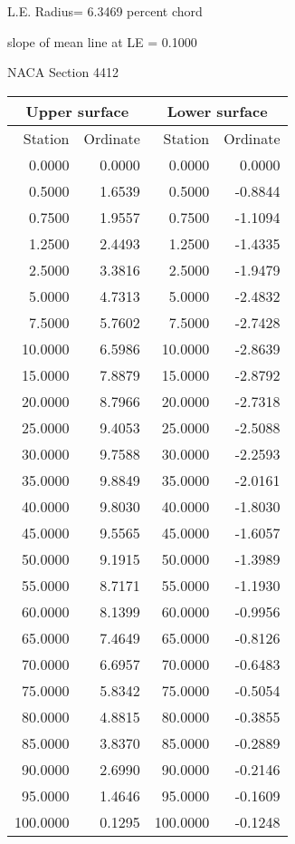 \documentclass[11pt]{book}
\begin{document}
L.E. Radius=  6.3469 percent chord


 slope of mean line at LE =  0.1000
 \newpage
  \label{s4412}
 \begin{Large}
 NACA Section 4412
 \end{Large}
  
 \vspace{8mm}
 \begin{tabular}{|r|r|r|r|} \hline 
 \multicolumn{2}{|c|}{Upper surface} & \multicolumn{2}{|c|}{Lower surface} \\
 \hline
 Station & Ordinate & Station & Ordinate \\
 \hline
0.0000 & 0.0000 & 0.0000 & 0.0000 \\
0.5000 & 1.6539 & 0.5000 & -0.8844 \\
0.7500 & 1.9557 & 0.7500 & -1.1094 \\
1.2500 & 2.4493 & 1.2500 & -1.4335 \\
2.5000 & 3.3816 & 2.5000 & -1.9479 \\
5.0000 & 4.7313 & 5.0000 & -2.4832 \\
7.5000 & 5.7602 & 7.5000 & -2.7428 \\
10.0000 & 6.5986 & 10.0000 & -2.8639 \\
15.0000 & 7.8879 & 15.0000 & -2.8792 \\
20.0000 & 8.7966 & 20.0000 & -2.7318 \\
25.0000 & 9.4053 & 25.0000 & -2.5088 \\
30.0000 & 9.7588 & 30.0000 & -2.2593 \\
35.0000 & 9.8849 & 35.0000 & -2.0161 \\
40.0000 & 9.8030 & 40.0000 & -1.8030 \\
45.0000 & 9.5565 & 45.0000 & -1.6057 \\
50.0000 & 9.1915 & 50.0000 & -1.3989 \\
55.0000 & 8.7171 & 55.0000 & -1.1930 \\
60.0000 & 8.1399 & 60.0000 & -0.9956 \\
65.0000 & 7.4649 & 65.0000 & -0.8126 \\
70.0000 & 6.6957 & 70.0000 & -0.6483 \\
75.0000 & 5.8342 & 75.0000 & -0.5054 \\
80.0000 & 4.8815 & 80.0000 & -0.3855 \\
85.0000 & 3.8370 & 85.0000 & -0.2889 \\
90.0000 & 2.6990 & 90.0000 & -0.2146 \\
95.0000 & 1.4646 & 95.0000 & -0.1609 \\
100.0000 & 0.1295 & 100.0000 & -0.1248 \\
 \hline 
 \end{tabular}
\end{document}
